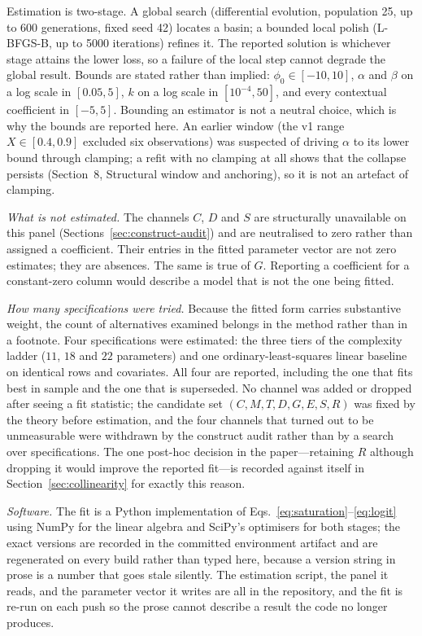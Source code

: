 \documentclass[11pt]{article}
\begin{document}
Estimation is two-stage. A global search (differential evolution, population 25, up to \num{600} generations, fixed seed \num{42}) locates a basin; a bounded local polish (L-BFGS-B, up to \num{5000} iterations) refines it. The reported solution is whichever stage attains the lower loss, so a failure of the local step cannot degrade the global result. Bounds are stated rather than implied: $\phi_0\in[-10,10]$, $\alpha$ and $\beta$ on a log scale in $[0.05,5]$, $k$ on a log scale in $[10^{-4},50]$, and every contextual coefficient in $[-5,5]$. Bounding an estimator is not a neutral choice, which is why the bounds are reported here. An earlier window (the v1 range $X\in[0.4,0.9]$ excluded six observations) was suspected of driving $\alpha$ to its lower bound through clamping; a refit with no clamping at all shows that the collapse persists (Section~8, Structural window and anchoring), so it is not an artefact of clamping.

\emph{What is not estimated.} The channels $C$, $D$ and $S$ are structurally unavailable on this panel (Sections~\ref{sec:construct-audit}) and are neutralised to zero rather than assigned a coefficient. Their entries in the fitted parameter vector are not zero estimates; they are absences. The same is true of $G$. Reporting a coefficient for a constant-zero column would describe a model that is not the one being fitted.

\emph{How many specifications were tried.} Because the fitted form carries substantive weight, the count of alternatives examined belongs in the method rather than in a footnote. Four specifications were estimated: the three tiers of the complexity ladder ($11$, $18$ and $22$ parameters) and one ordinary-least-squares linear baseline on identical rows and covariates. All four are reported, including the one that fits best in sample and the one that is superseded. No channel was added or dropped after seeing a fit statistic; the candidate set $(C,M,T,D,G,E,S,R)$ was fixed by the theory before estimation, and the four channels that turned out to be unmeasurable were withdrawn by the construct audit rather than by a search over specifications. The one post-hoc decision in the paper---retaining $R$ although dropping it would improve the reported fit---is recorded against itself in Section~\ref{sec:collinearity} for exactly this reason.

\emph{Software.} The fit is a Python implementation of Eqs.~\eqref{eq:saturation}--\eqref{eq:logit} using NumPy for the linear algebra and SciPy's optimisers for both stages; the exact versions are recorded in the committed environment artifact and are regenerated on every build rather than typed here, because a version string in prose is a number that goes stale silently. The estimation script, the panel it reads, and the parameter vector it writes are all in the repository, and the fit is re-run on each push so the prose cannot describe a result the code no longer produces.
\end{document}
